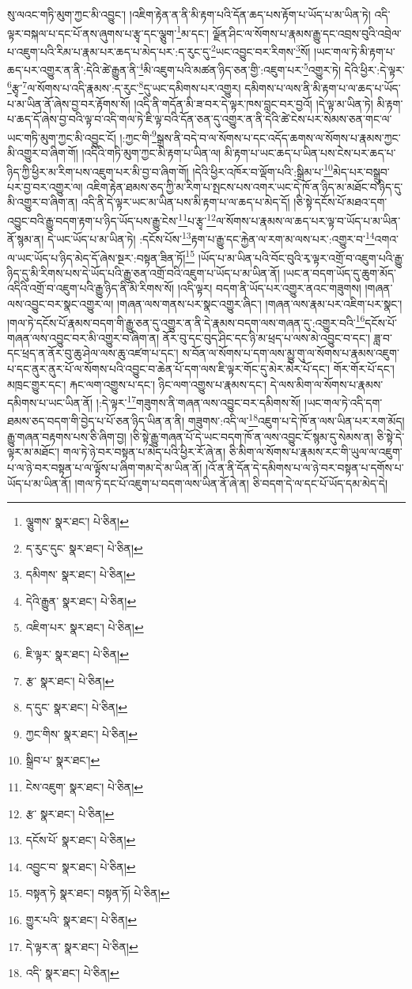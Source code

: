 སུ་ལའང་གཏི་མུག་ཀྱང་མི་འབྱུང་། །འཇིག་རྟེན་ན་ནི་མི་རྟག་པའི་དོན་ཆད་པས་རྟོག་པ་ཡོད་པ་མ་ཡིན་ཏེ། འདི་ལྟར་བསྐལ་པ་དང་པོ་ནས་ཞུགས་པ་རྩྭ་དང་ལྕུག་\footnote{ལྕུགས་  སྣར་ཐང་།  པེ་ཅིན། }མ་དང་། ལྗོན་ཤིང་ལ་སོགས་པ་རྣམས་རྒྱུ་དང་འབྲས་བུའི་འབྲེལ་པ་འཇུག་པའི་རིམ་པ་རྣམ་པར་ཆད་པ་མེད་པར་:ད་རུང་དུ་\footnote{ད་རུང་དུང་  སྣར་ཐང་།  པེ་ཅིན། }ཡང་འབྱུང་བར་རིགས་\footnote{དམིགས་  སྣར་ཐང་།  པེ་ཅིན། }སོ། །ཡང་གལ་ཏེ་མི་རྟག་པ་ཆད་པར་འགྱུར་ན་ནི་:དེའི་ཚེ་རྒྱུན་ནི་\footnote{དེའི་རྒྱུན་  སྣར་ཐང་།  པེ་ཅིན། }མི་འཇུག་པའི་མཚན་ཉིད་ཅན་གྱི་:འཇུག་པར་\footnote{འཇིག་པར་  སྣར་ཐང་།  པེ་ཅིན། }འགྱུར་ཏེ། དེའི་ཕྱིར་:དེ་ལྟར་\footnote{ཇི་ལྟར་  སྣར་ཐང་།  པེ་ཅིན། }རྩྭ་\footnote{རྩ་  སྣར་ཐང་།  པེ་ཅིན། }ལ་སོགས་པ་འདི་རྣམས་:ད་རུང་\footnote{ད་དུང་  སྣར་ཐང་།  པེ་ཅིན། }དུ་ཡང་དམིགས་པར་འགྱུར། དམིགས་པ་ལས་ནི་མི་རྟག་པ་ལ་ཆད་པ་ཡོད་པ་མ་ཡིན་ནོ་ཞེས་བྱ་བར་རྟོགས་སོ། །འདི་ནི་གདོན་མི་ཟ་བར་དེ་ལྟར་ཁས་བླང་བར་བྱའོ། །དེ་ལྟ་མ་ཡིན་ཏེ། མི་རྟག་པ་ཆད་དོ་ཞེས་བྱ་བའི་ལྟ་བ་འདི་གལ་ཏེ་ཇི་ལྟ་བའི་དོན་ཅན་དུ་འགྱུར་ན་ནི་དེའི་ཚེ་ངེས་པར་སེམས་ཅན་གང་ལ་ཡང་གཏི་མུག་ཀྱང་མི་འབྱུང་ངོ། །:ཀྱང་གི་\footnote{ཀྱང་གིས་  སྣར་ཐང་།  པེ་ཅིན། }སྒྲས་ནི་བདེ་བ་ལ་སོགས་པ་དང་འདོད་ཆགས་ལ་སོགས་པ་རྣམས་ཀྱང་མི་འགྱུར་བ་ཞིག་གོ། །འདིའི་གཏི་མུག་ཀྱང་མི་རྟག་པ་ཡིན་ལ། མི་རྟག་པ་ཡང་ཆད་པ་ཡིན་པས་ངེས་པར་ཆད་པ་ཉིད་ཀྱི་ཕྱིར་མ་རིག་པས་འཇུག་པར་མི་བྱ་བ་ཞིག་གོ། །དེའི་ཕྱིར་འཁོར་བ་ལྡོག་པའི་:སྒྲིམ་པ་\footnote{སྒྲིབ་པ་  སྣར་ཐང་། }མེད་པར་བསྒྲུབ་པར་བྱ་བར་འགྱུར་ལ། འཇིག་རྟེན་ཐམས་ཅད་ཀྱི་མ་རིག་པ་སྤངས་པས་འགར་ཡང་དེ་ཁོ་ན་ཉིད་མ་མཐོང་བ་ཉིད་དུ་མི་འགྱུར་བ་ཞིག་ན། འདི་ནི་དེ་ལྟར་ཡང་མ་ཡིན་པས་མི་རྟག་པ་ལ་ཆད་པ་མེད་དོ། །ཅི་སྟེ་དངོས་པོ་མཐའ་དག་འབྱུང་བའི་རྒྱུ་བདག་རྟག་པ་ཉིད་ཡོད་པས་རྒྱུ་ངེས་\footnote{ངེས་འཇུག་  སྣར་ཐང་།  པེ་ཅིན། }པ་རྩྭ་\footnote{རྩ་  སྣར་ཐང་།  པེ་ཅིན། }ལ་སོགས་པ་རྣམས་ལ་ཆད་པར་ལྟ་བ་ཡོད་པ་མ་ཡིན་ནོ་སྙམ་ན། དེ་ཡང་ཡོད་པ་མ་ཡིན་ཏེ། :དངོས་པོས་\footnote{དངོས་པོ་  སྣར་ཐང་།  པེ་ཅིན། }རྟག་པ་རྒྱུ་དང་རྐྱེན་ལ་རག་མ་ལས་པར་:འགྱུར་བ་\footnote{འབྱུང་བ་  སྣར་ཐང་།  པེ་ཅིན། }འགའ་ལ་ཡང་ཡོད་པ་ཉིད་མེད་དོ་ཞེས་སྔར་:བསྟན་ཟིན་ཏོ།\footnote{བསྟན་ཏེ  སྣར་ཐང་། བསྟན་ཏོ།  པེ་ཅིན། } །ཡོད་པ་མ་ཡིན་པའི་བོང་བུའི་རྭ་ལྟར་འགྲོ་བ་འཇུག་པའི་རྒྱུ་ཉིད་དུ་མི་རིགས་པས་དེ་ཡོད་པའི་རྒྱུ་ཅན་འགྲོ་བའི་འཇུག་པ་ཡོད་པ་མ་ཡིན་ནོ། །ཡང་ན་བདག་ཡོད་དུ་ཆུག་མོད་འདིའི་འགྲོ་བ་འཇུག་པའི་རྒྱུ་ཉིད་ནི་མི་རིགས་སོ། །འདི་ལྟར། བདག་ནི་ཡོད་པར་འགྱུར་ནའང་གཟུགས། །གཞན་ལས་འབྱུང་བར་སྣང་འགྱུར་ལ། །གཞན་ལས་གནས་པར་སྣང་འགྱུར་ཞིང་། །གཞན་ལས་རྣམ་པར་འཇིག་པར་སྣང་། །གལ་ཏེ་དངོས་པོ་རྣམས་བདག་གི་རྒྱུ་ཅན་དུ་འགྱུར་ན་ནི་དེ་རྣམས་བདག་ལས་གཞན་དུ་:འགྱུར་བའི་\footnote{གྱུར་པའི་  སྣར་ཐང་།  པེ་ཅིན། }དངོས་པོ་གཞན་ལས་འབྱུང་བར་མི་འགྱུར་བ་ཞིག་ན། ནོར་བུ་དང་བུད་ཤིང་དང་ཉི་མ་ཕྲད་པ་ལས་མེ་འབྱུང་བ་དང་། ཟླ་བ་དང་ཕྲད་ན་ནོར་བུ་ཆུ་ཤེལ་ལས་ཆུ་འཛག་པ་དང་། ས་བོན་ལ་སོགས་པ་དག་ལས་མྱུ་གུ་ལ་སོགས་པ་རྣམས་འཇུག་པ་དང་ནུར་ནུར་པོ་ལ་སོགས་པའི་འབྱུང་བ་ཆེན་པོ་དག་ལས་ཇི་ལྟར་གོང་དུ་མེར་མེར་པོ་དང་། གོར་གོར་པོ་དང་། མཁྲང་གྱུར་དང་། རྐང་ལག་འགྱུས་པ་དང་། ཉིང་ལག་འགྱུས་པ་རྣམས་དང་། དེ་ལས་མིག་ལ་སོགས་པ་རྣམས་དམིགས་པ་ཡང་ཡིན་ནོ། །:དེ་ལྟར་\footnote{དེ་ལྟར་ན་  སྣར་ཐང་།  པེ་ཅིན། }གཟུགས་ནི་གཞན་ལས་འབྱུང་བར་དམིགས་སོ། །ཡང་གལ་ཏེ་འདི་དག་ཐམས་ཅད་བདག་གི་བྱེད་པ་པོ་ཅན་ཉིད་ཡིན་ན་ནི། གཟུགས་:འདི་ལ་\footnote{འདི་  སྣར་ཐང་།  པེ་ཅིན། }འཇུག་པ་དེ་ཁོ་ན་ལས་ཡིན་པར་རག་མོད། རྒྱུ་གཞན་བརྟགས་པས་ཅི་ཞིག་བྱ། །ཅི་སྟེ་རྒྱུ་གཞན་པོ་དེ་ཡང་བདག་ཁོ་ན་ལས་འབྱུང་ངོ་སྙམ་དུ་སེམས་ན། ཅི་སྟེ་དེ་ལྟར་མ་མཐོང་། གལ་ཏེ་ཉེ་བར་བསྟན་པ་མེད་པའི་ཕྱིར་རོ་ཞེ་ན། ཅི་མིག་ལ་སོགས་པ་རྣམས་རང་གི་ཡུལ་ལ་འཇུག་པ་ལ་ཉེ་བར་བསྟན་པ་ལ་ལྟོས་པ་ཞིག་གམ་དེ་མ་ཡིན་ནོ། །འོ་ན་ནི་དོན་དེ་དམིགས་པ་ལ་ཉེ་བར་བསྟན་པ་དགོས་པ་ཡོད་པ་མ་ཡིན་ནོ། །གལ་ཏེ་དང་པོ་འཇུག་པ་བདག་ལས་ཡིན་ནོ་ཞེ་ན། ཅི་བདག་དེ་ལ་དང་པོ་ཡོད་དམ་མེད་དེ། 